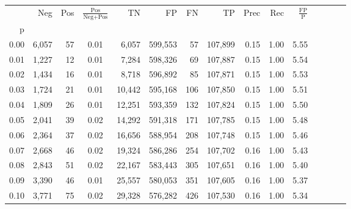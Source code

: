 \begin{tabular}{rrrcrrrrrrrrrrr}
\toprule
{} &     Neg &    Pos & $\frac{\text{Pos}}{\text{Neg}+\text{Pos}}$ &       TN &       FP &       FN &       TP &  Prec &   Rec & $\frac{\text{FP}}{\text{P}}$ \\
p    &         &        &                                            &          &          &          &          &       &       &                              \\
\midrule
0.00 &   6,057 &     57 &                                       0.01 &    6,057 &  599,553 &       57 &  107,899 &  0.15 &  1.00 &                         5.55 \\
0.01 &   1,227 &     12 &                                       0.01 &    7,284 &  598,326 &       69 &  107,887 &  0.15 &  1.00 &                         5.54 \\
0.02 &   1,434 &     16 &                                       0.01 &    8,718 &  596,892 &       85 &  107,871 &  0.15 &  1.00 &                         5.53 \\
0.03 &   1,724 &     21 &                                       0.01 &   10,442 &  595,168 &      106 &  107,850 &  0.15 &  1.00 &                         5.51 \\
0.04 &   1,809 &     26 &                                       0.01 &   12,251 &  593,359 &      132 &  107,824 &  0.15 &  1.00 &                         5.50 \\
0.05 &   2,041 &     39 &                                       0.02 &   14,292 &  591,318 &      171 &  107,785 &  0.15 &  1.00 &                         5.48 \\
0.06 &   2,364 &     37 &                                       0.02 &   16,656 &  588,954 &      208 &  107,748 &  0.15 &  1.00 &                         5.46 \\
0.07 &   2,668 &     46 &                                       0.02 &   19,324 &  586,286 &      254 &  107,702 &  0.16 &  1.00 &                         5.43 \\
0.08 &   2,843 &     51 &                                       0.02 &   22,167 &  583,443 &      305 &  107,651 &  0.16 &  1.00 &                         5.40 \\
0.09 &   3,390 &     46 &                                       0.01 &   25,557 &  580,053 &      351 &  107,605 &  0.16 &  1.00 &                         5.37 \\
0.10 &   3,771 &     75 &                                       0.02 &   29,328 &  576,282 &      426 &  107,530 &  0.16 &  1.00 &                         5.34 \\

\end{tabular}
